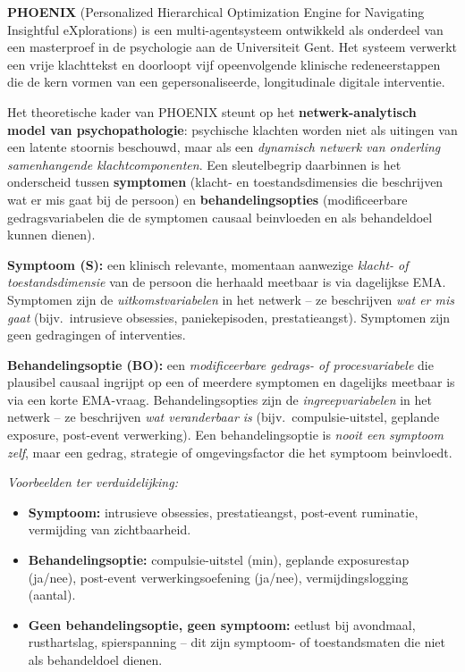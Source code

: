 \documentclass[11pt,a4paper]{article}
\begin{document}
\textbf{PHOENIX} (Personalized Hierarchical Optimization Engine for Navigating
Insightful eXplorations) is een multi-agentsysteem ontwikkeld als onderdeel van
een masterproef in de psychologie aan de Universiteit Gent. Het systeem verwerkt
een vrije klachttekst en doorloopt vijf opeenvolgende klinische redeneerstappen
die de kern vormen van een gepersonaliseerde, longitudinale digitale interventie.

Het theoretische kader van PHOENIX steunt op het \textbf{netwerk-analytisch model
van psychopathologie}: psychische klachten worden niet
als uitingen van een latente stoornis beschouwd, maar als een \emph{dynamisch
netwerk van onderling samenhangende klachtcomponenten}. Een sleutelbegrip daarbinnen
is het onderscheid tussen \textbf{symptomen} (klacht- en toestandsdimensies die
beschrijven wat er mis gaat bij de persoon) en \textbf{behandelingsopties}
(modificeerbare gedragsvariabelen die de symptomen causaal beinvloeden en als
behandeldoel kunnen dienen).

\vspace{0.4em}
\begin{instrbox}[title={Kerndefinities: symptoom versus behandelingsoptie}]
\small
\textbf{Symptoom (S):} een klinisch relevante, momentaan aanwezige
\emph{klacht- of toestandsdimensie} van de persoon die herhaald meetbaar is via
dagelijkse EMA. Symptomen zijn de \emph{uitkomstvariabelen} in het netwerk -- ze
beschrijven \emph{wat er mis gaat} (bijv.\ intrusieve obsessies, paniekepisoden,
prestatieangst). Symptomen zijn geen gedragingen of interventies.

\medskip
\textbf{Behandelingsoptie (BO):} een \emph{modificeerbare gedrags- of procesvariabele}
die plausibel causaal ingrijpt op een of meerdere symptomen en dagelijks meetbaar
is via een korte EMA-vraag. Behandelingsopties zijn de \emph{ingreepvariabelen} in het
netwerk -- ze beschrijven \emph{wat veranderbaar is} (bijv.\ compulsie-uitstel,
geplande exposure, post-event verwerking). Een behandelingsoptie is \emph{nooit een symptoom zelf},
maar een gedrag, strategie of omgevingsfactor die het symptoom beinvloedt.

\medskip\small
\textit{Voorbeelden ter verduidelijking:}
\begin{itemize}[topsep=1pt,itemsep=0pt]
\item \textbf{Symptoom:} intrusieve obsessies, prestatieangst, post-event ruminatie, vermijding van zichtbaarheid.
\item \textbf{Behandelingsoptie:} compulsie-uitstel (min), geplande exposurestap (ja/nee),
post-event verwerkingsoefening (ja/nee), vermijdingslogging (aantal).
\item \textbf{Geen behandelingsoptie, geen symptoom:} eetlust bij avondmaal, rusthartslag,
spierspanning -- dit zijn symptoom- of toestandsmaten die niet als behandeldoel dienen.
\end{itemize}
\end{instrbox}
\end{document}
